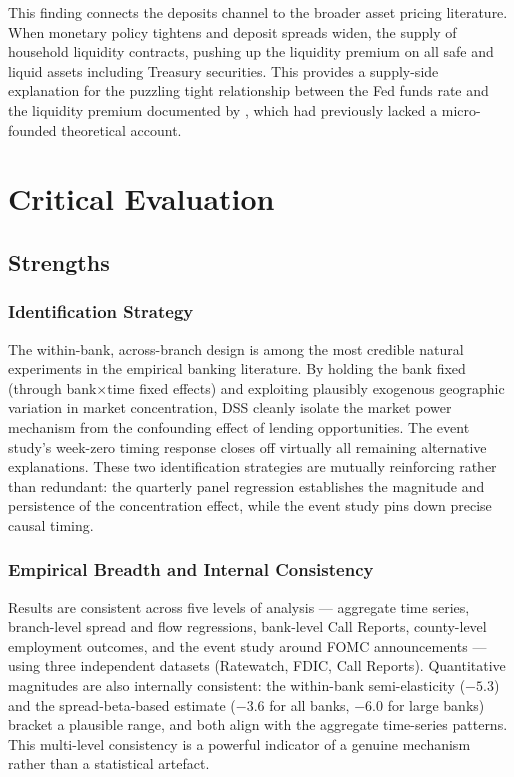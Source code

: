 \documentclass[12pt,a4paper]{article}
\begin{document}
This finding connects the deposits channel to the broader asset pricing
literature. When monetary policy tightens and deposit spreads widen, the supply
of household liquidity contracts, pushing up the liquidity premium on all safe
and liquid assets including Treasury securities. This provides a supply-side
explanation for the puzzling tight relationship between the Fed funds rate and
the liquidity premium documented by \citet{nagel_2016}, which had previously
lacked a micro-founded theoretical account.

\section{Critical Evaluation}
\label{sec:critical}

\subsection{Strengths}

\subsubsection{Identification Strategy}

The within-bank, across-branch design is among the most credible natural
experiments in the empirical banking literature. By holding the bank fixed
(through bank$\times$time fixed effects) and exploiting plausibly exogenous
geographic variation in market concentration, DSS cleanly isolate the market
power mechanism from the confounding effect of lending opportunities. The
event study's week-zero timing response closes off virtually all remaining
alternative explanations. These two identification strategies are mutually
reinforcing rather than redundant: the quarterly panel regression establishes
the magnitude and persistence of the concentration effect, while the event
study pins down precise causal timing.

\subsubsection{Empirical Breadth and Internal Consistency}

Results are consistent across five levels of analysis --- aggregate time series,
branch-level spread and flow regressions, bank-level Call Reports, county-level
employment outcomes, and the event study around FOMC announcements --- using
three independent datasets (Ratewatch, FDIC, Call Reports). Quantitative
magnitudes are also internally consistent: the within-bank semi-elasticity
($-5.3$) and the spread-beta-based estimate ($-3.6$ for all banks, $-6.0$ for
large banks) bracket a plausible range, and both align with the aggregate
time-series patterns. This multi-level consistency is a powerful indicator
of a genuine mechanism rather than a statistical artefact.
\end{document}
